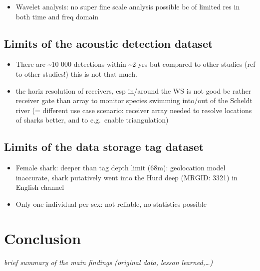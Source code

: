 \documentclass[
  authoryear,
  review,
  3p]{elsarticle}
\providecommand{\tightlist}{%
  \setlength{\itemsep}{0pt}\setlength{\parskip}{0pt}}\usepackage{longtable,booktabs,array}
\begin{document}
\begin{itemize}
\tightlist
\item
  Wavelet analysis: no super fine scale analysis possible bc of limited
  res in both time and freq domain
\end{itemize}

\hypertarget{limits-of-the-acoustic-detection-dataset}{%
\subsection{Limits of the acoustic detection
dataset}\label{limits-of-the-acoustic-detection-dataset}}

\begin{itemize}
\tightlist
\item
  There are \textasciitilde10 000 detections within \textasciitilde2 yrs
  but compared to other studies (ref to other studies!) this is not that
  much.
\item
  the horiz resolution of receivers, esp in/around the WS is not good bc
  rather receiver gate than array to monitor species swimming into/out
  of the Scheldt river (= different use case scenario: receiver array
  needed to resolve locations of sharks better, and to e.g.~enable
  triangulation)
\end{itemize}

\hypertarget{limits-of-the-data-storage-tag-dataset}{%
\subsection{Limits of the data storage tag
dataset}\label{limits-of-the-data-storage-tag-dataset}}

\begin{itemize}
\tightlist
\item
  Female shark: deeper than tag depth limit (68m): geolocation model
  inaccurate, shark putatively went into the Hurd deep (MRGID: 3321) in
  English channel
\item
  Only one individual per sex: not reliable, no statistics possible
\end{itemize}

\hypertarget{conclusion}{%
\section{Conclusion}\label{conclusion}}

\emph{brief summary of the main findings (original data, lesson
learned,\ldots)}
\end{document}
